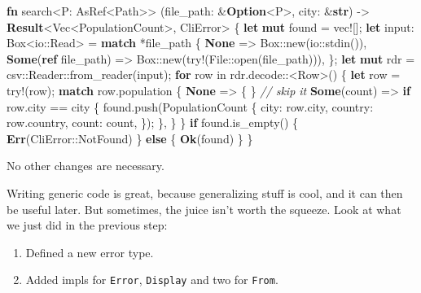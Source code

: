 \documentclass[a4paper,]{book}
\newenvironment{Shaded}{\begin{snugshade}}{\end{snugshade}}
\newcommand{\KeywordTok}[1]{\textcolor[rgb]{0.13,0.29,0.53}{\textbf{{#1}}}}
\newcommand{\CommentTok}[1]{\textcolor[rgb]{0.56,0.35,0.01}{\textit{{#1}}}}
\newcommand{\OtherTok}[1]{\textcolor[rgb]{0.56,0.35,0.01}{{#1}}}
\newcommand{\NormalTok}[1]{{#1}}
\begin{document}
\begin{Shaded}
\begin{Highlighting}[]
\KeywordTok{fn} \NormalTok{search<P: AsRef<Path>>}
         \NormalTok{(file_path: &}\KeywordTok{Option}\NormalTok{<P>, city: &}\KeywordTok{str}\NormalTok{)}
         \NormalTok{-> }\KeywordTok{Result}\NormalTok{<Vec<PopulationCount>, CliError> \{}
    \KeywordTok{let} \KeywordTok{mut} \NormalTok{found = }\OtherTok{vec!}\NormalTok{[];}
    \KeywordTok{let} \NormalTok{input: Box<io::Read> = }\KeywordTok{match} \NormalTok{*file_path \{}
        \KeywordTok{None} \NormalTok{=> Box::new(io::stdin()),}
        \KeywordTok{Some}\NormalTok{(}\KeywordTok{ref} \NormalTok{file_path) => Box::new(}\OtherTok{try!}\NormalTok{(File::open(file_path))),}
    \NormalTok{\};}
    \KeywordTok{let} \KeywordTok{mut} \NormalTok{rdr = csv::Reader::from_reader(input);}
    \KeywordTok{for} \NormalTok{row in rdr.decode::<Row>() \{}
        \KeywordTok{let} \NormalTok{row = }\OtherTok{try!}\NormalTok{(row);}
        \KeywordTok{match} \NormalTok{row.population \{}
            \KeywordTok{None} \NormalTok{=> \{ \} }\CommentTok{// skip it}
            \KeywordTok{Some}\NormalTok{(count) => }\KeywordTok{if} \NormalTok{row.city == city \{}
                \NormalTok{found.push(PopulationCount \{}
                    \NormalTok{city: row.city,}
                    \NormalTok{country: row.country,}
                    \NormalTok{count: count,}
                \NormalTok{\});}
            \NormalTok{\},}
        \NormalTok{\}}
    \NormalTok{\}}
    \KeywordTok{if} \NormalTok{found.is_empty() \{}
        \KeywordTok{Err}\NormalTok{(CliError::NotFound)}
    \NormalTok{\} }\KeywordTok{else} \NormalTok{\{}
        \KeywordTok{Ok}\NormalTok{(found)}
    \NormalTok{\}}
\NormalTok{\}}
\end{Highlighting}
\end{Shaded}

No other changes are necessary.


Writing generic code is great, because generalizing stuff is cool, and
it can then be useful later. But sometimes, the juice isn't worth the
squeeze. Look at what we just did in the previous step:

\begin{enumerate}
\def\labelenumi{\arabic{enumi}.}
\itemsep1pt\parskip0pt
\item
  Defined a new error type.
\item
  Added impls for \texttt{Error}, \texttt{Display} and two for
  \texttt{From}.
\end{enumerate}
\end{document}
